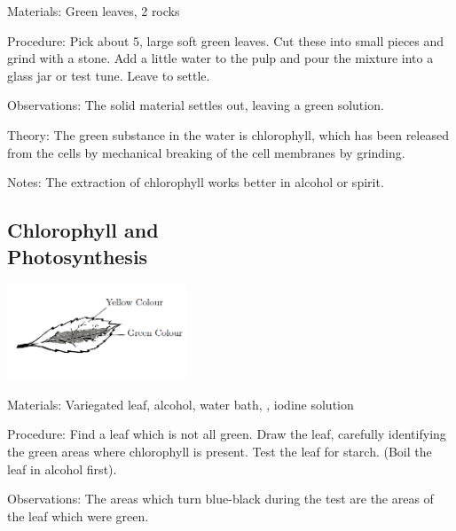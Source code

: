 \begin{multicols}{2}
\begin{description*}
\item[Materials:]{Green leaves, 2 rocks}
\item[Procedure:]{Pick about 5, large soft green leaves. Cut these into small pieces and grind with a stone.
Add a little water to the pulp and pour the mixture into a glass jar or test tune. Leave to settle.}
\item[Observations:]{The solid material settles out, leaving a green solution.}
\item[Theory:]{The green substance in the water is chlorophyll, which has been released from the cells by
mechanical breaking of the cell membranes by grinding.}
\item[Notes:]{The extraction of chlorophyll works better in alcohol or spirit.}
\end{description*}

\subsection[Chlorophyll and Photosynthesis]{Chlorophyll and \hfill \\ Photosynthesis} %

\begin{center}
\includegraphics[width=0.4\textwidth]{./img/variegated-leaf.png}
\end{center}

\begin{description*}
\item[Materials:]{Variegated leaf, alcohol, water bath, , iodine solution}
\item[Procedure:]{Find a leaf which is not all green. Draw the
leaf, carefully identifying the
green areas where chlorophyll is
present. Test the leaf for starch.
(Boil the leaf in alcohol first).
}
\item[Observations:]{The areas which turn
blue-black during the test are the
areas of the leaf which were
green.}
\end{description*}


\end{multicols}
